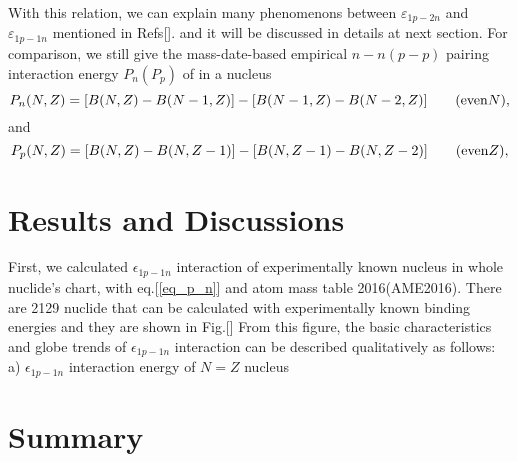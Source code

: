 With this relation, we can explain many phenomenons between $\varepsilon_{1p-2n}$ and $\varepsilon_{1p-1n}$ mentioned in Refs[]. and it will be discussed in details at next section. For comparison, we still give the  mass-date-based empirical $n-n(p-p)$ pairing interaction energy $P_n(P_p)$ of in a nucleus
\begin{equation}\label{eq_P_n}
P_n(N,Z)=[B(N,Z)-B(N-1,Z)]-[B(N-1,Z)-B(N-2,Z)]\qquad({\rm even} N),
\end{equation}
and
\begin{equation}\label{eq_P_n}
P_p(N,Z)=[B(N,Z)-B(N,Z-1)]-[B(N,Z-1)-B(N,Z-2)]\qquad({\rm even} Z),
\end{equation}
\section{Results and Discussions}
First, we calculated $\epsilon_{1p-1n}$ interaction of experimentally known nucleus in whole nuclide's chart, with eq.[\ref{eq_p_n}] and atom mass table 2016(AME2016). There are 2129 nuclide that can be calculated with experimentally known binding energies and they are shown in Fig.[] From this figure, the basic characteristics and globe trends of $\epsilon_{1p-1n}$ interaction can be described qualitatively as follows: a) $\epsilon_{1p-1n}$ interaction energy of $N=Z$ nucleus 
\section{Summary}